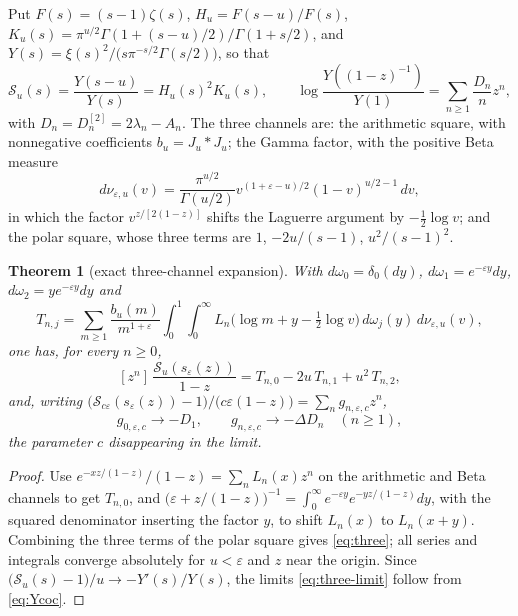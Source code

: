 \documentclass[11pt]{amsart}
\newtheorem{theorem}{Theorem}[section]
\theoremstyle{definition}
\theoremstyle{remark}
\theoremstyle{definition}
\newcommand{\eps}{\varepsilon}
\begin{document}
Put $F(s)=(s-1)\zeta(s)$, $H_u=F(s-u)/F(s)$,
$K_u(s)=\pi^{u/2}\Gamma(1+(s-u)/2)/\Gamma(1+s/2)$, and
$Y(s)=\xi(s)^2/\bigl(s\pi^{-s/2}\Gamma(s/2)\bigr)$, so that
\begin{equation}\label{eq:Ycoc}
   \mathcal S_u(s)=\frac{Y(s-u)}{Y(s)}=H_u(s)^2K_u(s),
   \qquad
   \log\frac{Y((1-z)^{-1})}{Y(1)}=\sum_{n\ge1}\frac{D_n}{n}z^n ,
\end{equation}
with $D_n=D_n^{[2]}=2\lambda_n-A_n$. The three channels are: the arithmetic square, with
nonnegative coefficients $b_u=J_u*J_u$; the Gamma factor, with the positive Beta measure
\begin{equation}\label{eq:beta-measure}
   d\nu_{\eps,u}(v)=\frac{\pi^{u/2}}{\Gamma(u/2)}
   v^{(1+\eps-u)/2}(1-v)^{u/2-1}\,dv ,
\end{equation}
in which the factor $v^{z/[2(1-z)]}$ shifts the Laguerre argument by $-\tfrac12\log v$; and the
polar square, whose three terms are $1$, $-2u/(s-1)$, $u^2/(s-1)^2$.

\begin{theorem}[exact three-channel expansion]\label{thm:three}
With $d\omega_0=\delta_0(dy)$, $d\omega_1=e^{-\eps y}dy$, $d\omega_2=ye^{-\eps y}dy$ and
\[
   T_{n,j}=\sum_{m\ge1}\frac{b_u(m)}{m^{1+\eps}}
   \int_0^1\!\!\int_0^\infty
   L_n\bigl(\log m+y-\tfrac12\log v\bigr)\,d\omega_j(y)\,d\nu_{\eps,u}(v),
\]
one has, for every $n\ge0$,
\begin{equation}\label{eq:three}
   [z^n]\,\frac{\mathcal S_u(s_\eps(z))}{1-z}=T_{n,0}-2u\,T_{n,1}+u^2\,T_{n,2},
\end{equation}
and, writing
$\bigl(\mathcal S_{c\eps}(s_\eps(z))-1\bigr)\big/\bigl(c\eps(1-z)\bigr)
=\sum_ng_{n,\eps,c}z^n$,
\begin{equation}\label{eq:three-limit}
   g_{0,\eps,c}\to-D_1,\qquad
   g_{n,\eps,c}\to-\Delta D_n\quad(n\ge1),
\end{equation}
the parameter $c$ disappearing in the limit.
\end{theorem}

\begin{proof}
Use $e^{-xz/(1-z)}/(1-z)=\sum_nL_n(x)z^n$ on the arithmetic and Beta channels to get $T_{n,0}$,
and $\bigl(\eps+z/(1-z)\bigr)^{-1}=\int_0^\infty e^{-\eps y}e^{-yz/(1-z)}dy$, with the squared
denominator inserting the factor $y$, to shift $L_n(x)$ to $L_n(x+y)$. Combining the three terms
of the polar square gives \eqref{eq:three}; all series and integrals converge absolutely for
$u<\eps$ and $z$ near the origin. Since $\bigl(\mathcal S_u(s)-1\bigr)/u\to-Y'(s)/Y(s)$, the
limits \eqref{eq:three-limit} follow from \eqref{eq:Ycoc}.
\end{proof}
\end{document}
